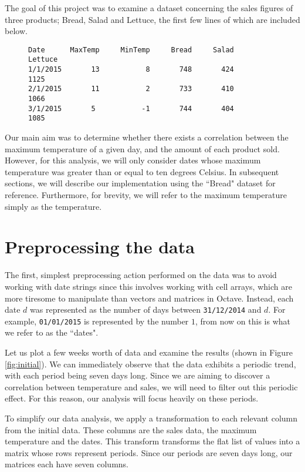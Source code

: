 The goal of this project was to examine a dataset concerning the sales figures of three products; Bread, Salad and Lettuce, the first few lines of which are included below.

\begin{figure}[h!]
\centering
\begin{verbatim}
Date      MaxTemp     MinTemp     Bread     Salad     Lettuce
1/1/2015       13           8       748       424        1125
2/1/2015       11           2       733       410        1066
3/1/2015       5           -1       744       404        1085
\end{verbatim}
\end{figure}

Our main aim was to determine whether there exists a correlation between the maximum temperature of a given day, and the amount of each product sold. However, for this analysis, we will only consider dates whose maximum temperature was greater than or equal to ten degrees Celsius. In subsequent sections, we will describe our implementation using the ``Bread" dataset for reference. Furthermore, for brevity, we will refer to the maximum temperature simply as the temperature.

\section{Preprocessing the data}\label{sec:preprocess}

The first, simplest preprocessing action performed on the data was to avoid working with date strings since this involves working with cell arrays, which are more tiresome to manipulate than vectors and matrices in Octave. Instead, each date $d$ was represented as the number of days between \texttt{31/12/2014} and $d$. For example, \texttt{01/01/2015} is represented by the number $1$, from now on this is what we refer to as the ``dates". 

Let us plot a few weeks worth of data and examine the results (shown in Figure \ref{fig:initial}). We can immediately observe that the data exhibits a periodic trend, with each period being seven days long. Since we are aiming to discover a correlation between temperature and sales, we will need to filter out this periodic effect. For this reason, our analysis will focus heavily on these periods.


To simplify our data analysis, we apply a transformation to each relevant column from the initial data. These columns are the sales data, the maximum temperature and the dates. This transform transforms the flat list of values into a matrix whose rows represent periods. Since our periods are seven days long, our matrices each have seven columns.

